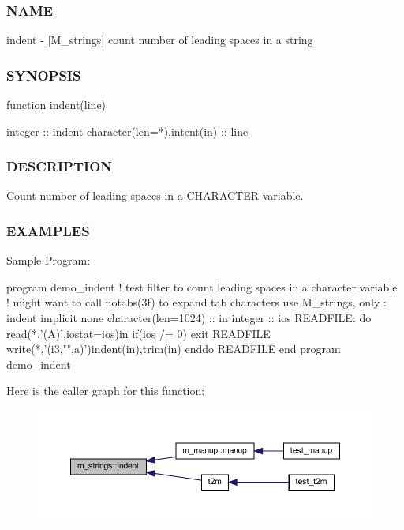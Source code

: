 \subsubsection*{N\+A\+ME}

indent -\/ \mbox{[}M\+\_\+strings\mbox{]} count number of leading spaces in a string 

\subsubsection*{S\+Y\+N\+O\+P\+S\+IS}

\begin{DoxyVerb}function indent(line)

 integer                        :: indent
 character(len=*),intent(in)    :: line
\end{DoxyVerb}


\subsubsection*{D\+E\+S\+C\+R\+I\+P\+T\+I\+ON}

Count number of leading spaces in a C\+H\+A\+R\+A\+C\+T\+ER variable.

\subsubsection*{E\+X\+A\+M\+P\+L\+ES}

\begin{DoxyVerb}Sample Program:

 program demo_indent
 !  test filter to count leading spaces in a character variable
 !  might want to call notabs(3f) to expand tab characters
 use M_strings, only : indent
 implicit none
 character(len=1024) :: in
 integer             :: ios
    READFILE: do
       read(*,'(A)',iostat=ios)in
       if(ios /= 0) exit READFILE
       write(*,'(i3,"",a)')indent(in),trim(in)
    enddo READFILE
 end program demo_indent \end{DoxyVerb}
 Here is the caller graph for this function\+:
\nopagebreak
\begin{figure}[H]
\begin{center}
\leavevmode
\includegraphics[width=350pt]{namespacem__strings_a020dcca7f01d33eedf28b17518a22b69_icgraph}
\end{center}
\end{figure}
\mbox{\label{namespacem__strings_ad8fd9bbf618bdba2c3ac9fb3c8174362}} 
